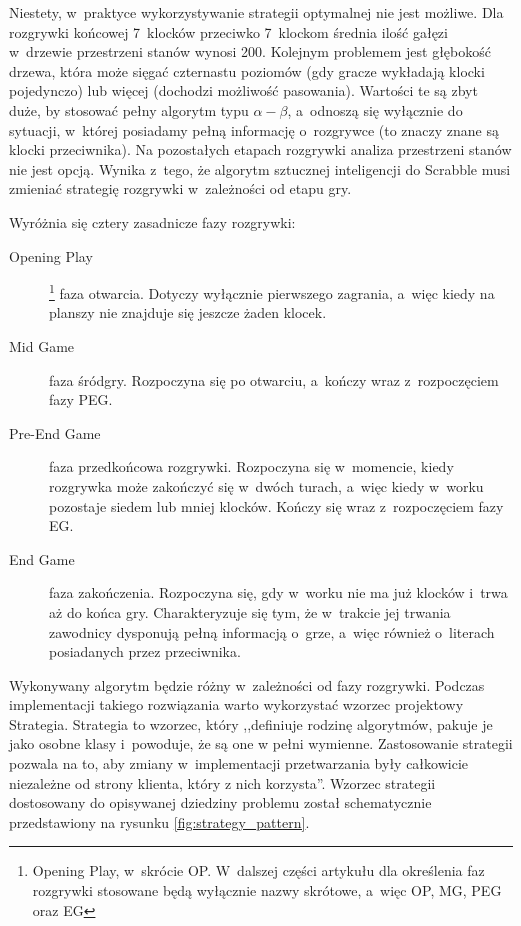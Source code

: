 \documentclass[a4paper,twocolumn,12pt]{article}
\theoremstyle{definition}
\begin{document}
Niestety, w~praktyce wykorzystywanie strategii optymalnej nie jest możliwe. Dla rozgrywki końcowej 7~klocków przeciwko 7~klockom średnia ilość gałęzi w~drzewie przestrzeni stanów wynosi 200. Kolejnym problemem jest głębokość drzewa, która może sięgać czternastu poziomów (gdy gracze wykładają klocki pojedynczo) lub więcej (dochodzi możliwość pasowania). Wartości te są zbyt duże, by stosować pełny algorytm typu $\alpha - \beta$, a~odnoszą się wyłącznie do sytuacji, w~której posiadamy pełną informację o~rozgrywce (to znaczy znane są klocki przeciwnika). Na pozostałych etapach rozgrywki analiza przestrzeni stanów nie jest opcją. Wynika z~tego, że algorytm sztucznej inteligencji do Scrabble musi zmieniać strategię rozgrywki w~zależności od etapu gry.

Wyróżnia się cztery zasadnicze fazy rozgrywki: \cite{sheppard_maven}

\begin{description}
	\item[Opening Play]\footnote{Opening Play, w~skrócie OP. W~dalszej części artykułu dla określenia faz rozgrywki stosowane będą wyłącznie nazwy skrótowe, a~więc OP, MG, PEG oraz EG} faza otwarcia. Dotyczy wyłącznie pierwszego zagrania, a~więc kiedy na planszy nie znajduje się jeszcze żaden klocek.
	\item[Mid Game] faza śródgry. Rozpoczyna się po otwarciu, a~kończy wraz z~rozpoczęciem fazy PEG.
	\item[Pre-End Game] faza przedkońcowa rozgrywki. Rozpoczyna się w~momencie, kiedy rozgrywka może zakończyć się w~dwóch turach, a~więc kiedy w~worku pozostaje siedem lub mniej klocków. Kończy się wraz z~rozpoczęciem fazy EG.
	\item[End Game] faza zakończenia. Rozpoczyna się, gdy w~worku nie ma już klocków i~trwa aż do końca gry. Charakteryzuje się tym, że w~trakcie jej trwania zawodnicy dysponują pełną informacją o~grze, a~więc również o~literach posiadanych przez przeciwnika.
\end{description}

Wykonywany algorytm będzie różny w~zależności od fazy rozgrywki. Podczas implementacji takiego rozwiązania warto wykorzystać wzorzec projektowy Strategia. Strategia to wzorzec, który ,,definiuje rodzinę algorytmów, pakuje je jako osobne klasy i~powoduje, że są one w pełni wymienne. Zastosowanie strategii pozwala na to, aby zmiany w~implementacji przetwarzania były całkowicie niezależne od strony klienta, który z nich korzysta''. \cite{strategy_pattern_definition} Wzorzec strategii dostosowany do opisywanej dziedziny problemu został schematycznie przedstawiony na rysunku \ref{fig:strategy_pattern}.
\end{document}
